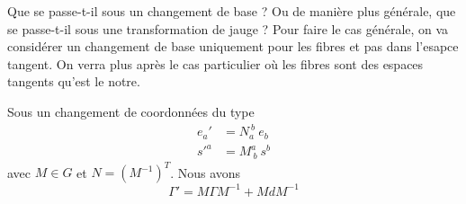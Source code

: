 \documentclass[a4paper,11pt]{report}
\begin{document}
            Que se passe-t-il sous un changement de base ? Ou de manière plus générale, que se passe-t-il sous une transformation de jauge ? Pour faire le cas générale, on va considérer un changement de base uniquement pour les fibres et pas dans l'esapce tangent. On verra plus après le cas particulier où les fibres sont des espaces tangents qu'est le notre.
            
            \begin{prop}\begin{leftbar}
                Sous un changement de coordonnées du type
                \begin{align}
                    e_a' &= N_a^{~b}~e_b \\
                    s'^a &= M^a_{~b} ~s^b
                \end{align}
                 avec $M\in G$ et $N = (M^{-1})^T$. Nous avons
                 \begin{equation}
                     \Gamma' = M\Gamma M^{-1} + MdM^{-1}
                 \end{equation}
            \end{leftbar}\end{prop}
        
\end{document}

